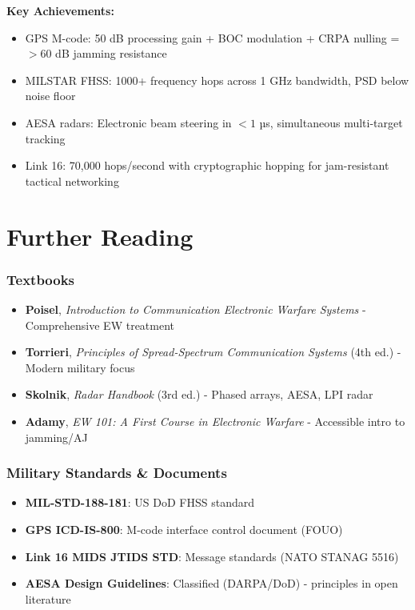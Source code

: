 \textbf{Key Achievements:}
\begin{itemize}
\item GPS M-code: 50 dB processing gain + BOC modulation + CRPA nulling = $>60$ dB jamming resistance
\item MILSTAR FHSS: 1000+ frequency hops across 1 GHz bandwidth, PSD below noise floor
\item AESA radars: Electronic beam steering in $<1$ µs, simultaneous multi-target tracking
\item Link 16: 70,000 hops/second with cryptographic hopping for jam-resistant tactical networking
\end{itemize}

\section{Further Reading}

\subsubsection{Textbooks}\label{textbooks}

\begin{itemize}
\tightlist
\item
  \textbf{Poisel}, \emph{Introduction to Communication Electronic
  Warfare Systems} - Comprehensive EW treatment
\item
  \textbf{Torrieri}, \emph{Principles of Spread-Spectrum Communication
  Systems} (4th ed.) - Modern military focus
\item
  \textbf{Skolnik}, \emph{Radar Handbook} (3rd ed.) - Phased arrays,
  AESA, LPI radar
\item
  \textbf{Adamy}, \emph{EW 101: A First Course in Electronic Warfare} -
  Accessible intro to jamming/AJ
\end{itemize}

\subsubsection{Military Standards \&
Documents}\label{military-standards-documents}

\begin{itemize}
\tightlist
\item
  \textbf{MIL-STD-188-181}: US DoD FHSS standard
\item
  \textbf{GPS ICD-IS-800}: M-code interface control document (FOUO)
\item
  \textbf{Link 16 MIDS JTIDS STD}: Message standards (NATO STANAG 5516)
\item
  \textbf{AESA Design Guidelines}: Classified (DARPA/DoD) - principles
  in open literature
\end{itemize}

